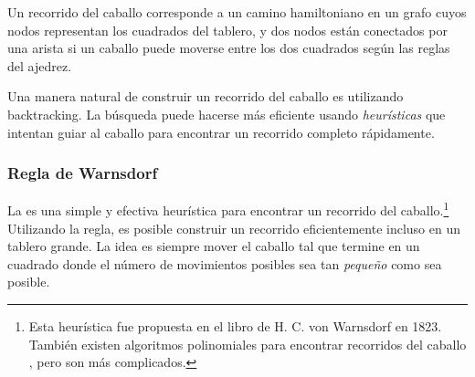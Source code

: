 \begin{center}
\end{center}

Un recorrido del caballo corresponde a un camino hamiltoniano en un grafo
cuyos nodos representan los cuadrados del tablero, y dos nodos están
conectados por una arista si un caballo puede moverse entre los dos
cuadrados según las reglas del ajedrez.

Una manera natural de construir un recorrido del caballo es utilizando
backtracking. La búsqueda puede hacerse más eficiente usando
\emph{heurísticas} que intentan guiar al caballo para encontrar un
recorrido completo rápidamente.

\subsubsection{Regla de Warnsdorf}


La  es una simple y efectiva heurística para
encontrar un recorrido del caballo.\footnote{Esta heurística fue
    propuesta en el libro de H. C. von Warnsdorf \cite{war23} en 1823.
    También existen algoritmos polinomiales para encontrar recorridos del
    caballo \cite{par97}, pero son más complicados.}
Utilizando la regla, es posible construir un recorrido eficientemente
incluso en un tablero grande. La idea es siempre mover el caballo
tal que termine en un cuadrado donde el número de movimientos posibles
sea tan \emph{pequeño} como sea posible.

